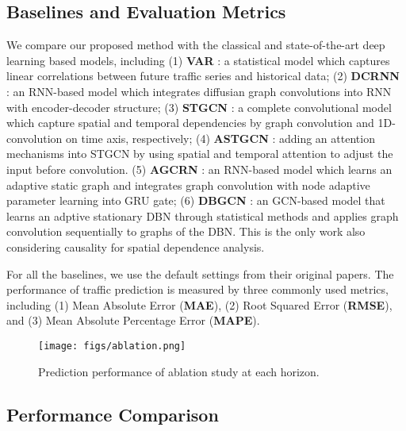 \documentclass[letterpaper, 10 pt, conference]{ieeeconf}
\begin{document}
\subsection{Baselines and Evaluation Metrics}
We compare our proposed method with the classical and state-of-the-art deep learning based models, including (1) \textbf{VAR} \cite{zivot2006vector}: a statistical model which captures linear correlations between future traffic series and historical data; (2) \textbf{DCRNN} \cite{li2017diffusion}: an RNN-based model which integrates diffusian graph convolutions into RNN with encoder-decoder structure; (3) \textbf{STGCN} \cite{yu2017spatio}: a complete convolutional model which capture spatial and temporal dependencies by graph convolution and 1D-convolution on time axis, respectively; (4) \textbf{ASTGCN} \cite{guo2019attention}: adding an attention mechanisms into STGCN by using spatial and temporal attention to adjust the input before convolution. (5) \textbf{AGCRN} \cite{bai2020adaptive}: an RNN-based model which learns an adaptive static graph and integrates graph convolution with node adaptive parameter learning into GRU gate; 
(6) \textbf{DBGCN} \cite{luan2022traffic}: an GCN-based model that learns an adptive stationary DBN through statistical methods and applies graph convolution sequentially to graphs of the DBN. This is the only work also considering causality for spatial dependence analysis.

For all the baselines, we use the default settings from their original papers. The performance of traffic prediction is measured by three commonly used metrics, including (1) Mean Absolute Error (\textbf{MAE}), (2) Root Squared Error (\textbf{RMSE}), and (3) Mean Absolute Percentage Error (\textbf{MAPE}). 

\begin{figure*}[t]
\centering
        \texttt{[image: figs/ablation.png]}
\caption{Prediction performance of ablation study at each horizon.}
        \label{fig:ablation}
\end{figure*}

\subsection{Performance Comparison}
\end{document}
